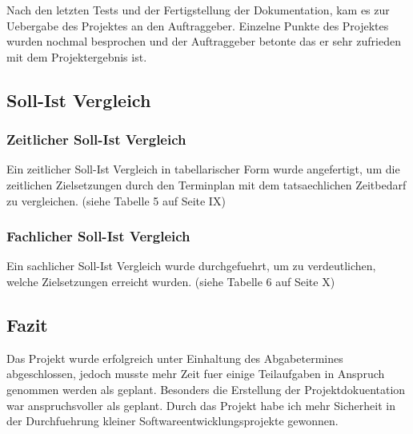 Nach den letzten Tests und der Fertigstellung der Dokumentation, kam es zur
Uebergabe des Projektes an den Auftraggeber. Einzelne Punkte des Projektes
wurden nochmal besprochen und der Auftraggeber betonte das er sehr zufrieden
mit dem Projektergebnis ist.

\subsection{Soll-Ist Vergleich}

\subsubsection{Zeitlicher Soll-Ist Vergleich}
Ein zeitlicher Soll-Ist Vergleich in tabellarischer Form wurde angefertigt, um
die zeitlichen Zielsetzungen durch den Terminplan mit dem tatsaechlichen
Zeitbedarf zu vergleichen. (siehe Tabelle 5 auf Seite IX)

\subsubsection{Fachlicher Soll-Ist Vergleich}
Ein sachlicher Soll-Ist Vergleich wurde durchgefuehrt, um zu verdeutlichen,
welche Zielsetzungen erreicht wurden. (siehe Tabelle 6 auf Seite X)

\subsection{Fazit}
Das Projekt wurde erfolgreich unter Einhaltung des Abgabetermines abgeschlossen,
jedoch musste mehr Zeit fuer einige Teilaufgaben in Anspruch genommen werden als
geplant. Besonders die Erstellung der Projektdokuentation war anspruchsvoller
als geplant. Durch das Projekt habe ich mehr Sicherheit in der Durchfuehrung
kleiner Softwareentwicklungsprojekte gewonnen.

